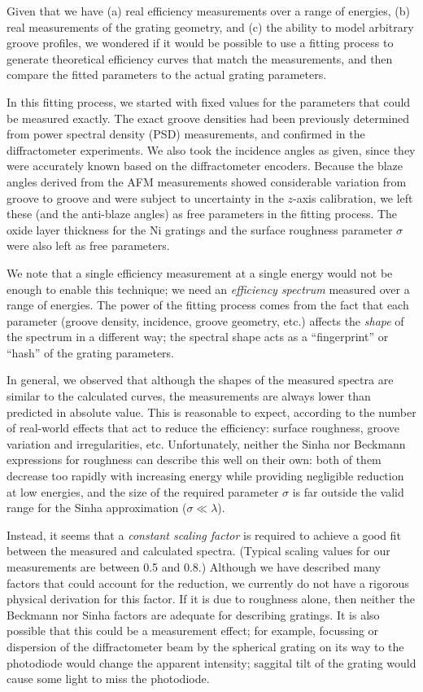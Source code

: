 Given that we have (a) real efficiency measurements over a range of energies, (b) real measurements of the grating geometry, and (c) the ability to model arbitrary groove profiles, we wondered if it would be possible to use a fitting process to generate theoretical efficiency curves that match the measurements, and then compare the fitted parameters to the actual grating parameters.

In this fitting process, we started with fixed values for the parameters that could be measured exactly.  The exact groove densities had been previously determined from power spectral density (PSD) measurements, and confirmed in the diffractometer experiments.  We also took the incidence angles as given, since they were accurately known based on the diffractometer encoders.  Because the blaze angles derived from the AFM measurements showed considerable variation from groove to groove and were subject to uncertainty in the $z$-axis calibration, we left these (and the anti-blaze angles) as free parameters in the fitting process.  The oxide layer thickness for the Ni gratings and the surface roughness parameter $\sigma$ were also left as free parameters.
 
 We note that a single efficiency measurement at a single energy would not be enough to enable this technique; we need an \emph{efficiency spectrum} measured over a range of energies.  The power of the fitting process comes from the fact that each parameter (groove density, incidence, groove geometry, etc.) affects the \emph{shape} of the spectrum in a different way; the spectral shape acts as a ``fingerprint'' or ``hash'' of the grating parameters.
 
In general, we observed that although the shapes of the measured spectra are similar to the calculated curves, the measurements are always lower than predicted in absolute value.  This is reasonable to expect, according to the number of real-world effects that act to reduce the efficiency: surface roughness, groove variation and irregularities, etc.  Unfortunately, neither the Sinha  nor Beckmann  expressions for roughness can describe this well on their own: both of them decrease too rapidly with increasing energy while providing negligible reduction at low energies, and the size of the required parameter $\sigma$ is far outside the valid range for the Sinha approximation ($\sigma \ll \lambda$).

Instead, it seems that a \emph{constant scaling factor} is required to achieve a good fit between the measured and calculated spectra.  (Typical scaling values for our measurements are between 0.5 and 0.8.) Although we have described many factors that could account for the reduction, we currently do not have a rigorous physical derivation for this factor.  If it is due to roughness alone, then neither the Beckmann nor Sinha factors are adequate for describing gratings.  It is also possible that this could be a measurement effect; for example, focussing or dispersion of the diffractometer beam by the spherical grating on its way to the photodiode would change the apparent intensity; saggital tilt of the grating would cause some light to miss the photodiode.

